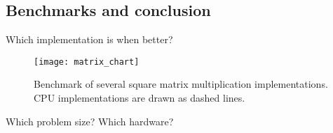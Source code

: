 \subsection{Benchmarks and conclusion}
Which implementation is when better?



\begin{figure}
\centering
\texttt{[image: matrix\_chart]}
\caption{Benchmark of several square matrix multiplication implementations. CPU implementations are drawn as dashed lines.}
\label{fig:matrix_chart}
\end{figure}

Which problem size?
Which hardware?

